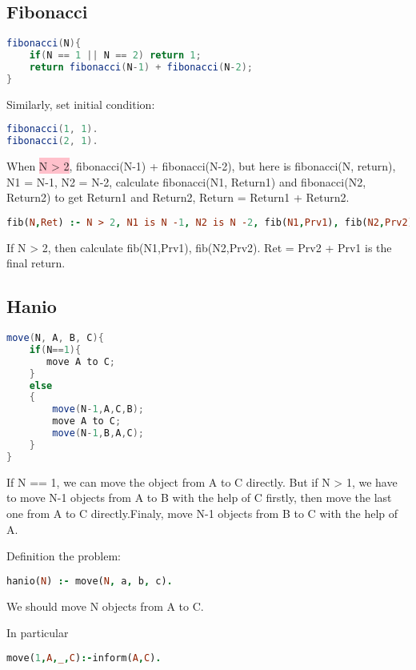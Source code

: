 \documentclass[a4paper, 11pt]{article}
\begin{document}
\subsection{Fibonacci}
\begin{lstlisting}[language={java}]
fibonacci(N){
    if(N == 1 || N == 2) return 1;
    return fibonacci(N-1) + fibonacci(N-2);
}
\end{lstlisting}

Similarly, set initial condition:
\begin{lstlisting}[language={java}]
fibonacci(1, 1).
fibonacci(2, 1).
\end{lstlisting}

When \colorbox{pink}{\color{black} N > 2},  fibonacci(N-1) + fibonacci(N-2), but here is  fibonacci(N, return), N1 = N-1, N2 = N-2, calculate  fibonacci(N1, Return1) and fibonacci(N2, Return2) to get Return1 and Return2, Return = Return1 + Return2.

\begin{lstlisting}[language={prolog}]
fib(N,Ret) :- N > 2, N1 is N -1, N2 is N -2, fib(N1,Prv1), fib(N2,Prv2), Ret is Prv2 + Prv1.
\end{lstlisting}

If N > 2, then calculate fib(N1,Prv1), fib(N2,Prv2). Ret = Prv2 + Prv1 is the final return.

\subsection{Hanio}
\begin{lstlisting}[language={java}]
move(N, A, B, C){
    if(N==1){
       move A to C;
    }
    else
    {
        move(N-1,A,C,B);
        move A to C;
        move(N-1,B,A,C);
    }
}
\end{lstlisting}

If N == 1, we can move the object from A to C directly. But if N > 1, we have to move N-1 objects from A to B with the help of C firstly, then move the last one from A to C directly.Finaly, move N-1 objects from B to C with the help of A. 

Definition the problem:
\begin{lstlisting}[language={prolog}]
hanio(N) :- move(N, a, b, c).
\end{lstlisting}

We should move N objects from A to C.

In particular
\begin{lstlisting}[language={prolog}]
move(1,A,_,C):-inform(A,C).
\end{lstlisting}
\end{document}
